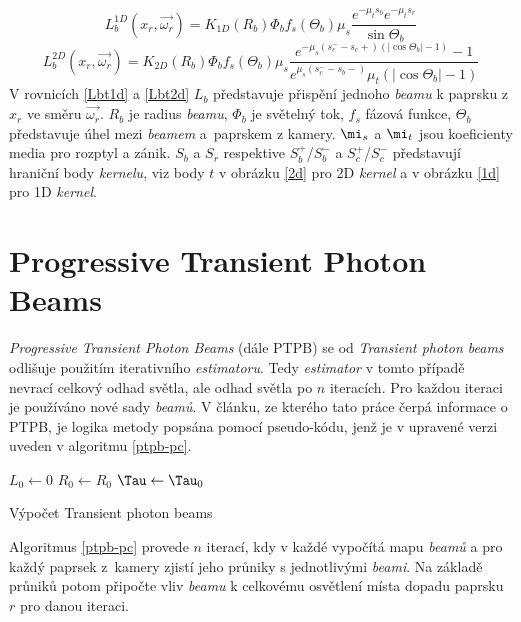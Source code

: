  \begin{equation}\label{Lbt1d}
    L_b^{1D}(x_r,\vec{\omega_r}) = K_{1D}(R_b)\Phi_b f_s(\Theta_b)\mu_s \frac{e^{-\mu_t s_b}e^{-\mu_t s_r}}{\sin{\Theta_b}}
\end{equation} 
\begin{equation}
 \label{Lbt2d}
    L_b^{2D}(x_r,\vec{\omega_r}) = K_{2D}(R_b)\Phi_b f_s(\Theta_b)\mu_s \frac{e^{-\mu_s(s_c^--s_c+)(|\cos{\Theta_b}|-1)}-1}{e^{\mu_s(s_c^--s_b-)}\mu_t(|\cos{\Theta_b}|-1)}
\end{equation}
V rovnicích  \ref{Lbt1d} a \ref{Lbt2d} $L_b$ představuje přispění jednoho \textit{beamu} k paprsku  z $x_r$ ve směru $\vec{\omega_r}$. $R_b$ je radius \textit{beamu}, $\Phi_b$ je světelný tok, $f_s$ fázová funkce, $\Theta_b$ představuje úhel mezi \textit{beamem} a~paprskem z kamery. $\mi_s$ a $\mi_t$ jsou koeficienty media pro rozptyl a zánik. $S_b$ a $S_r$ respektive $S_b^+$/$S_b^-$ a $S_c^+$/$S_c^-$ představují hraniční body \textit{kernelu}, viz body $t$ v obrázku \ref{2d} pro 2D \textit{kernel} a v obrázku \ref{1d} pro 1D \textit{kernel}.
\section{Progressive Transient Photon Beams}
\textit{Progressive Transient Photon Beams} (dále PTPB) se od \textit{Transient photon beams} odlišuje použitím iterativního \textit{estimatoru}. Tedy \textit{estimator} v tomto případě nevrací celkový odhad světla, ale odhad světla po $n$ iteracích. Pro každou iteraci je používáno nové sady \textit{beamů}. V článku\cite{ptpb}, ze kterého tato práce čerpá informace o PTPB, je logika metody popsána pomocí pseudo-kódu, jenž je v upravené verzi uveden v algoritmu \ref{ptpb-pc}.
\begin{algorithm}[h]\label{ptpb-pc}
\SetAlgoLined
{}
 $L_0 \gets 0$\;
 $R_0 \gets R_0$\;
 $\Tau \gets \Tau_0$\;
 \caption{Výpočet Transient photon beams}
\end{algorithm}
\newpage
Algoritmus \ref{ptpb-pc} provede $n$ iterací, kdy v každé vypočítá mapu \textit{beamů} a pro každý paprsek z~kamery zjistí jeho průniky s jednotlivými \textit{beami}. Na základě průniků potom připočte vliv \textit{beamu} k celkovému osvětlení místa dopadu paprsku $r$ pro danou iteraci.

